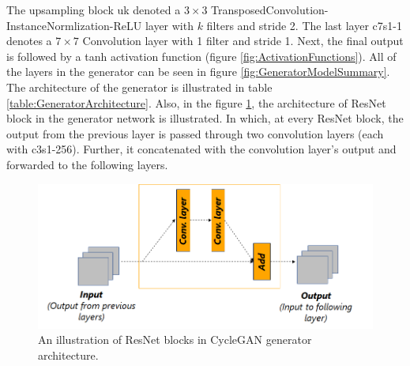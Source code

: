 The upsampling block {\selectfont uk} denoted a $3 \times 3$ TransposedConvolution-InstanceNormlization-ReLU layer with $k$ filters and stride 2. The last layer {\selectfont c7s1-1} denotes a $7 \times 7$ Convolution layer with 1 filter and stride 1. Next, the final output is followed by a tanh activation function (figure \ref{fig:ActivationFunctions}). All of the layers in the generator can be seen in figure \ref{fig:GeneratorModelSummary}. The architecture of the generator is illustrated in table \ref{table:GeneratorArchitecture}. Also, in the figure \ref{fig:resnetBlock}, the architecture of \ac{ResNet} block in the generator network is illustrated. In which, at every \ac{ResNet} block, the output from the previous layer is passed through two convolution layers (each with {\selectfont c3s1-256}). Further, it concatenated with the convolution layer's output and forwarded to the following layers.


\vspace*{1.0cm}
\begin{figure}[H]
        \begin{center}
	    \includegraphics[scale=0.65]{images/Implementation/resnetBlocks.png}
	    \caption[An illustration of ResNet blocks in \ac{CycleGAN} generator architecture.]{An illustration of ResNet blocks in \ac{CycleGAN} generator architecture.}
	    \label{fig:resnetBlock}
	    \end{center}
\end{figure}


